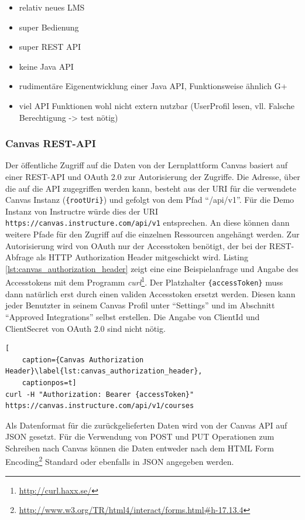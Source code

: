\begin{itemize}
    \item relativ neues LMS
    \item super Bedienung
    \item super REST API
    \item keine Java API
    \item rudimentäre Eigenentwicklung einer Java API, Funktionsweise ähnlich  G+
    \item viel API Funktionen wohl nicht extern nutzbar (UserProfil lesen, vll. Falsche Berechtigung -> test nötig)
\end{itemize}

\subsubsection{Canvas REST-API} %
\label{ssub:canvas_api}

Der öffentliche Zugriff auf die Daten von der Lernplattform Canvas basiert auf einer REST-API und OAuth 2.0 zur Autorisierung der Zugriffe. Die Adresse, über die auf die API zugegriffen werden kann, besteht aus der URI für die verwendete Canvas Instanz (\texttt{\{rootUri\}}) und gefolgt von dem Pfad \enquote{/api/v1}. Für die Demo Instanz von Instructre würde dies der URI \texttt{https://canvas.instructure.com/api/v1} entsprechen. An diese können dann weitere Pfade für den Zugriff auf die einzelnen Ressourcen angehängt werden. Zur Autorisierung wird von OAuth nur der Accesstoken benötigt, der bei der REST-Abfrage als HTTP Authorization Header mitgeschickt wird. Listing \ref{lst:canvas_authorization_header} zeigt eine eine Beispielanfrage und Angabe des Accesstokens mit dem Programm \emph{curl}\footnote{\url{http://curl.haxx.se/}}. Der Platzhalter \texttt{\{accessToken\}} muss dann natürlich erst durch einen validen Accesstoken ersetzt werden. Diesen kann jeder Benutzter in seinem Canvas Profil unter \enquote{Settings} und im Abschnitt \enquote{Approved Integrations} selbst erstellen. Die Angabe von ClientId und ClientSecret von OAuth 2.0 sind nicht nötig.

\begin{lstlisting}[
    caption={Canvas Authorization Header}\label{lst:canvas_authorization_header},
    captionpos=t]
curl -H "Authorization: Bearer {accessToken}" https://canvas.instructure.com/api/v1/courses
\end{lstlisting}

Als Datenformat für die zurückgelieferten Daten wird von der Canvas API auf JSON gesetzt. Für die Verwendung von POST und PUT Operationen zum Schreiben nach Canvas können die Daten entweder nach dem HTML Form Encoding\footnote{\url{http://www.w3.org/TR/html4/interact/forms.html\#h-17.13.4}} Standard oder ebenfalls in JSON angegeben werden. 


